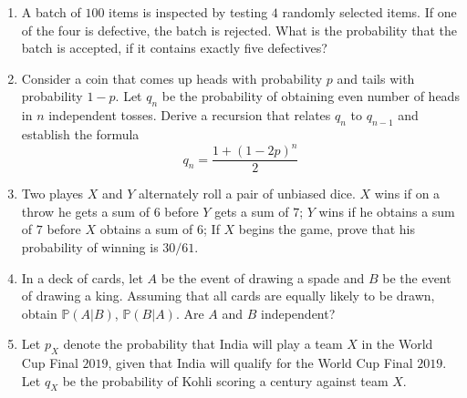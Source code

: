 \documentclass{article}
\newcommand{\Pb}{\mathbb{P}}
\newcommand{\bkt}[1]{\left(#1\right)}
\begin{document}
\begin{enumerate}
\begin{enumerate}
		\end{enumerate}
		\item
		A batch of $100$ items is inspected by testing $4$ randomly selected items. If one of the four is defective, the batch is rejected. What is the probability that the batch is accepted, if it contains exactly five defectives?
		\item
		Consider a coin that comes up heads with probability $p$ and tails with probability $1-p$. Let $q_n$ be the probability of obtaining even number of heads in $n$ independent tosses. Derive a recursion that relates $q_n$ to $q_{n-1}$ and establish the formula
		$$q_n = \dfrac{1+\bkt{1-2p}^n}2$$
		\item
		Two playes $X$ and $Y$ alternately roll a pair of unbiased dice. $X$ wins if on a throw he gets a sum of $6$ before $Y$ gets a sum of $7$; $Y$ wins if he obtains a sum of $7$ before $X$ obtains a sum of $6$; If $X$ begins the game, prove that his probability of winning is $30/61$.
		\item
		In a deck of cards, let $A$ be the event of drawing a spade and $B$ be the event of drawing a king. Assuming that all cards are equally likely to be drawn, obtain $\Pb(A \vert B)$, $\Pb (B \vert A)$. Are $A$ and $B$ independent?
		\item
		Let $p_X$ denote the probability that India will play a team $X$ in the World Cup Final $2019$, given that India will qualify for the World Cup Final $2019$. Let $q_X$ be the probability of Kohli scoring a century against team $X$.


\end{enumerate}
\end{document}
